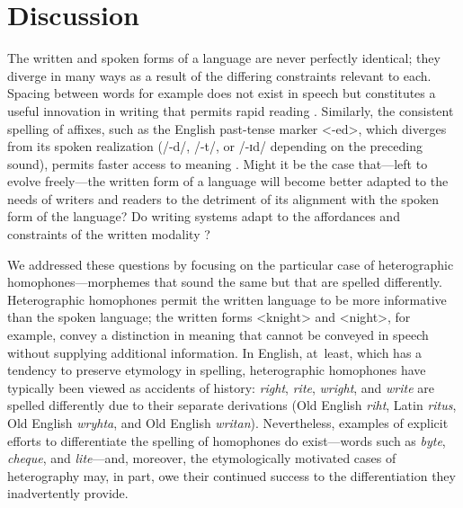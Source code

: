 \documentclass[doc,biblatex]{apa7}
\begin{document}

\section{Discussion}

The written and spoken forms of a language are never perfectly identical; they diverge in many ways as a result of the differing constraints relevant to each. Spacing between words for example does not exist in speech but constitutes a useful innovation in writing that permits rapid reading \parencite{RaynerFischer:1998, Sainio:2007, Zang:2013}. Similarly, the consistent spelling of affixes, such as the English past-tense marker <-ed>, which diverges from its spoken realization (/-d/, /-t/, or /-ɪd/ depending on the preceding sound), permits faster access to meaning \parencite{}. Might it be the case that---left to evolve freely---the written form of a language will become better adapted to the needs of writers and readers to the detriment of its alignment with the spoken form of the language? Do writing systems adapt to the affordances and constraints of the written modality \parencite{Rastle:2019}?

We addressed these questions by focusing on the particular case of heterographic homophones---morphemes that sound the same but that are spelled differently. Heterographic homophones permit the written language to be more informative than the spoken language; the written forms <knight> and <night>, for example, convey a distinction in meaning that cannot be conveyed in speech without supplying additional information. In English, at~least, which has a tendency to preserve etymology in spelling, heterographic homophones have typically been viewed as accidents of history: \textit{right}, \textit{rite}, \textit{wright}, and \textit{write} are spelled differently due to their separate derivations (Old English \textit{riht}, Latin \textit{ritus}, Old English \textit{wryhta}, and Old English \textit{writan}). Nevertheless, examples of explicit efforts to differentiate the spelling of homophones do exist---words such as \textit{byte}, \textit{cheque}, and \textit{lite}---and, moreover, the etymologically motivated cases of heterography may, in part, owe their continued success to the differentiation they inadvertently provide.
\end{document}
